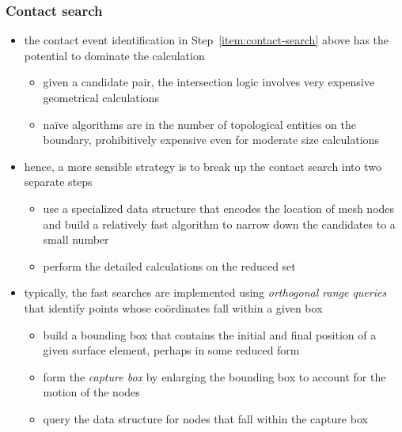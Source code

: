 \begin{frame}[fragile]
%
  \frametitle{Contact search}
%
  \begin{itemize}
%
  \item the contact event identification in Step~\ref{item:contact-search} above has the
    potential to dominate the calculation
    \begin{itemize}
    \item given a candidate pair, the intersection logic involves very expensive geometrical
      calculations
    \item na\"ive algorithms are  in the number of topological entities on the
      boundary, prohibitively expensive even for moderate size calculations
    \end{itemize}
%
  \item hence, a more sensible strategy is to break up the contact search into two separate steps
    \begin{itemize}
    \item use a specialized data structure that encodes the location of mesh nodes and build a
      relatively fast algorithm to narrow down the candidates to a small number
    \item perform the detailed calculations on the reduced set
    \end{itemize}
%
  \item typically, the fast searches are implemented using {\em orthogonal range queries} that
    identify points whose co\"ordinates fall within a given box
    \begin{itemize}
    \item build a bounding box that contains the initial and final position of a given surface
      element, perhaps in some reduced form 
    \item form the {\em capture box} by enlarging the bounding box to account for the motion of
      the nodes
    \item query the data structure for nodes that fall within the capture box
    \end{itemize}
%
  \end{itemize}
%
\end{frame}

